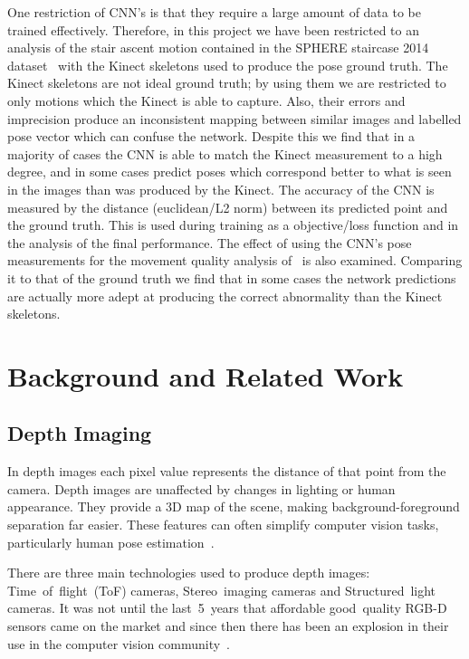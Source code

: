 \documentclass[11pt]{article} %
\begin{document}
One restriction of CNN's is that they require a large amount of data to be trained effectively. Therefore, in this project we have been restricted to an analysis of the stair ascent motion contained in the SPHERE staircase 2014 dataset~\cite{Paiement} with the Kinect skeletons used to produce the pose ground truth. The Kinect skeletons are not ideal ground truth; by using them we are restricted to only motions which the Kinect is able to capture. Also, their errors and imprecision produce an inconsistent mapping between similar images and labelled pose vector which can confuse the network. Despite this we find that in a majority of cases the CNN is able to match the Kinect measurement to a high degree, and in some cases predict poses which correspond better to what is seen in the images than was produced by the Kinect. The accuracy of the CNN is measured by the distance (euclidean/L2 norm) between its predicted point and the ground truth. This is used during training as a objective/loss function and in the analysis of the final performance. The effect of using the CNN's pose measurements for the movement quality analysis of~\cite{Paiement,Tao} is also examined. Comparing it to that of the ground truth we find that in some cases the network predictions are actually more adept at producing the correct abnormality than the Kinect skeletons.






\section{Background and Related Work}

\subsection{Depth Imaging}
\label{sec:Depth}


In depth images each pixel value represents the distance of that point from the camera. Depth images are unaffected by changes in lighting or human appearance. They provide a 3D map of the scene, making background-foreground separation far easier. These features can often simplify computer vision tasks, particularly human pose estimation~\cite{Chen2013}.

There are three main technologies used to produce depth images: Time~of~flight~(ToF) cameras, Stereo~imaging cameras and Structured~light cameras. It was not until the last~5~years that affordable good~quality RGB-D sensors came on the market and since then there has been an explosion in their use in the computer vision community~\cite{Han2013}.
\end{document}

